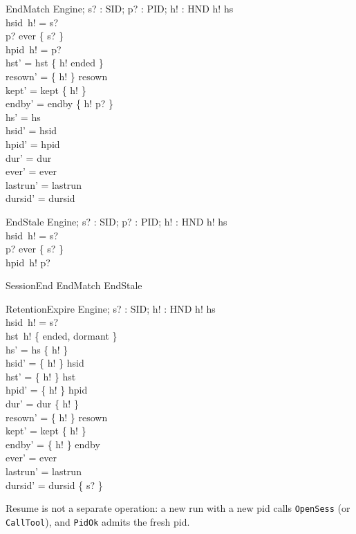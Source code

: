 \documentclass[a4paper,10pt,fleqn]{article}
\begin{document}
\begin{schema}{EndMatch}
  \Delta Engine; s? : SID; p? : PID; h! : HND
\where
  h! \in hs \\
  hsid~h! = s? \\
  p? \in ever \limg \{ s? \} \rimg \\
  hpid~h! = p? \\
  hst' = hst \oplus \{ h! \mapsto ended \} \\
  resown' = \{ h! \} \ndres resown \\
  kept' = kept \setminus \{ h! \} \\
  endby' = endby \oplus \{ h! \mapsto p? \} \\
  hs' = hs \\
  hsid' = hsid \\
  hpid' = hpid \\
  dur' = dur \\
  ever' = ever \\
  lastrun' = lastrun \\
  dursid' = dursid
\end{schema}

\begin{schema}{EndStale}
  \Xi Engine; s? : SID; p? : PID; h! : HND
\where
  h! \in hs \\
  hsid~h! = s? \\
  p? \in ever \limg \{ s? \} \rimg \\
  hpid~h! \neq p?
\end{schema}

\begin{zed}
  SessionEnd  EndMatch \lor EndStale
\end{zed}

\begin{schema}{RetentionExpire}
  \Delta Engine; s? : SID; h! : HND
\where
  h! \in hs \\
  hsid~h! = s? \\
  hst~h! \in \{ ended, dormant \} \\
  hs' = hs \setminus \{ h! \} \\
  hsid' = \{ h! \} \ndres hsid \\
  hst' = \{ h! \} \ndres hst \\
  hpid' = \{ h! \} \ndres hpid \\
  dur' = dur \setminus \{ h! \} \\
  resown' = \{ h! \} \ndres resown \\
  kept' = kept \setminus \{ h! \} \\
  endby' = \{ h! \} \ndres endby \\
  ever' = ever \\
  lastrun' = lastrun \\
  dursid' = dursid \setminus \{ s? \}
\end{schema}

Resume is not a separate operation: a new run with a new pid calls
\texttt{OpenSess} (or \texttt{CallTool}), and \texttt{PidOk} admits the fresh
pid.
\end{document}
